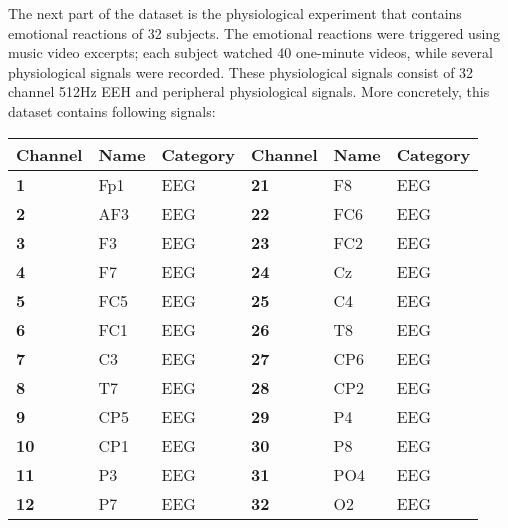 \npar

The next part of the dataset is the physiological experiment that contains emotional reactions of 32 subjects. The emotional reactions were triggered using music video excerpts; each subject watched 40 one-minute videos, while several physiological signals were recorded. These physiological signals consist of 32 channel 512Hz EEH and peripheral physiological signals. More concretely, this dataset contains following signals:
\begin{table}[H]
\centering
\label{DEAPSignals}
\begin{tabular}{l|ll|l|ll}
\textbf{Channel} & \textbf{Name} & \textbf{Category} & \textbf{Channel} & \textbf{Name}    & \textbf{Category} \\ \hline
\textbf{1}       & Fp1           & EEG               & \textbf{21}      & F8               & EEG               \\
\textbf{2}       & AF3           & EEG               & \textbf{22}      & FC6              & EEG               \\
\textbf{3}       & F3            & EEG               & \textbf{23}      & FC2              & EEG               \\
\textbf{4}       & F7            & EEG               & \textbf{24}      & Cz               & EEG               \\
\textbf{5}       & FC5           & EEG               & \textbf{25}      & C4               & EEG               \\
\textbf{6}       & FC1           & EEG               & \textbf{26}      & T8               & EEG               \\
\textbf{7}       & C3            & EEG               & \textbf{27}      & CP6              & EEG               \\
\textbf{8}       & T7            & EEG               & \textbf{28}      & CP2              & EEG               \\
\textbf{9}       & CP5           & EEG               & \textbf{29}      & P4               & EEG               \\
\textbf{10}      & CP1           & EEG               & \textbf{30}      & P8               & EEG               \\
\textbf{11}      & P3            & EEG               & \textbf{31}      & PO4              & EEG               \\
\textbf{12}      & P7            & EEG               & \textbf{32}      & O2               & EEG               \\

\end{tabular}
\end{table}
